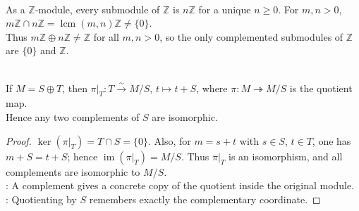 \begin{example} \label{ex:z-submodules-mostly-not-complemented} \\
As a $\mathbb{Z}$-module, every submodule of $\mathbb{Z}$ is $n\mathbb{Z}$ for a unique $n\geq0$. For $m,n>0$, $m\mathbb{Z}\cap n\mathbb{Z}=\operatorname{lcm}(m,n)\mathbb{Z}\neq\{0\}$.\\
Thus $m\mathbb{Z}\oplus n\mathbb{Z}\neq\mathbb{Z}$ for all $m,n>0$, so the only complemented submodules of $\mathbb{Z}$ are $\{0\}$ and $\mathbb{Z}$.
\end{example}

\begin{theorem} \label{thm:complements-and-quotients-modules} \\
If $M=S\oplus T$, then $\pi|_T:T\xrightarrow{\sim}M/S$, $t\mapsto t+S$, where $\pi:M\twoheadrightarrow M/S$ is the quotient map.\\
Hence any two complements of $S$ are isomorphic.
\begin{proof} $\ker(\pi|_T)=T\cap S=\{0\}$. Also, for $m=s+t$ with $s\in S$, $t\in T$, one has $m+S=t+S$; hence $\operatorname{im}(\pi|_T)=M/S$. Thus $\pi|_T$ is an isomorphism, and all complements are isomorphic to $M/S$.\\
: A complement gives a concrete copy of the quotient inside the original module.\\
: Quotienting by $S$ remembers exactly the complementary coordinate.
\end{proof}
\end{theorem}

